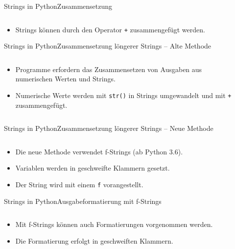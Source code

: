 \documentclass[xelatex,aspectratio=169]{beamer}
\begin{document}
\begin{frame}{Strings in Python}{Zusammensetzung}
    \inputminted{python}{src/strings_concat.py}
    \begin{itemize}
        \item Strings können durch den Operator \texttt{+} zusammengefügt werden.
    \end{itemize}
\end{frame}

\begin{frame}{Strings in Python}{Zusammensetzung löngerer Strings -- Alte Methode}
    \begin{columns}
        \begin{column}{0.5\textwidth}
            \begin{itemize}
                \item Programme erfordern das Zusammensetzen von Ausgaben aus numerischen Werten und Strings.
                \item Numerische Werte werden mit \texttt{str()} in Strings umgewandelt und mit \texttt{+} zusammengefügt.
            \end{itemize}
        \end{column}
        \begin{column}{0.5\textwidth}
            \inputminted{python}{src/strings_concat_long_old.py}
        \end{column}
    \end{columns}

\end{frame}

\begin{frame}{Strings in Python}{Zusammensetzung löngerer Strings -- Neue Methode}
    \inputminted{python}{src/strings_concat_long_new.py}
    \begin{itemize}
        \item Die neue Methode verwendet f-Strings (ab Python 3.6).
        \item Variablen werden in geschweifte Klammern gesetzt.
        \item Der String wird mit einem \texttt{f} vorangestellt.
    \end{itemize}
\end{frame}

\begin{frame}{Strings in Python}{Ausgabeformatierung mit f-Strings}
    \inputminted{python}{src/strings_concat_long_new_float.py}
    \begin{itemize}
        \item Mit f-Strings können auch Formatierungen vorgenommen werden.
        \item Die Formatierung erfolgt in geschweiften Klammern.
    \end{itemize}
\end{frame}



\end{document}
